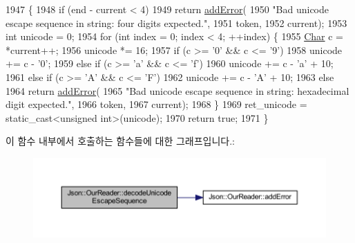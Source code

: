 \begin{DoxyCode}
1947                                                                     \{
1948   \textcolor{keywordflow}{if} (end - current < 4)
1949     \textcolor{keywordflow}{return} \hyperlink{class_json_1_1_our_reader_aa6a920311e6408ff3a45324d49da18a6}{addError}(
1950         \textcolor{stringliteral}{"Bad unicode escape sequence in string: four digits expected."},
1951         token,
1952         current);
1953   \textcolor{keywordtype}{int} unicode = 0;
1954   \textcolor{keywordflow}{for} (\textcolor{keywordtype}{int} index = 0; index < 4; ++index) \{
1955     \hyperlink{class_json_1_1_our_reader_a0cd0bab4caa66594ab843ccd5f9dc239}{Char} c = *current++;
1956     unicode *= 16;
1957     \textcolor{keywordflow}{if} (c >= \textcolor{charliteral}{'0'} && c <= \textcolor{charliteral}{'9'})
1958       unicode += c - \textcolor{charliteral}{'0'};
1959     \textcolor{keywordflow}{else} \textcolor{keywordflow}{if} (c >= \textcolor{charliteral}{'a'} && c <= \textcolor{charliteral}{'f'})
1960       unicode += c - \textcolor{charliteral}{'a'} + 10;
1961     \textcolor{keywordflow}{else} \textcolor{keywordflow}{if} (c >= \textcolor{charliteral}{'A'} && c <= \textcolor{charliteral}{'F'})
1962       unicode += c - \textcolor{charliteral}{'A'} + 10;
1963     \textcolor{keywordflow}{else}
1964       \textcolor{keywordflow}{return} \hyperlink{class_json_1_1_our_reader_aa6a920311e6408ff3a45324d49da18a6}{addError}(
1965           \textcolor{stringliteral}{"Bad unicode escape sequence in string: hexadecimal digit expected."},
1966           token,
1967           current);
1968   \}
1969   ret\_unicode = \textcolor{keyword}{static\_cast<}\textcolor{keywordtype}{unsigned} \textcolor{keywordtype}{int}\textcolor{keyword}{>}(unicode);
1970   \textcolor{keywordflow}{return} \textcolor{keyword}{true};
1971 \}
\end{DoxyCode}
이 함수 내부에서 호출하는 함수들에 대한 그래프입니다.\+:\nopagebreak
\begin{figure}[H]
\begin{center}
\leavevmode
\includegraphics[width=350pt]{class_json_1_1_our_reader_adb39be814cc6076b91a0919bdd5b24b0_cgraph}
\end{center}
\end{figure}
